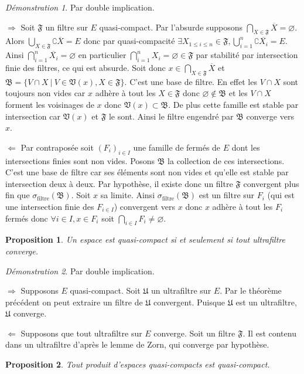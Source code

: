\documentclass[a4paper, 11pt, french]{book}
\newenvironment{itemise}{\itemize}{\enditemize}
\theoremstyle{plain} %
\newtheorem{proposition}{Proposition}
\theoremstyle{definition} %
\theoremstyle{remark} %
\newtheorem*{demonstration}{Démonstration}
\newcommand{\1}{\mathds{1}}
\newcommand\vide{\varnothing}
\renewcommand{\frak}[1]{\mathfrak{#1}}
\newcommand{\rm}[1]{\mathrm{#1}}
\newcommand\ens[2]{\{#1 \ |\ #2\}}
\newcommand\equivalence[3]{
	\begin{demonstration}
		#1
		\begin{itemise}
			\item[$\Longrightarrow$] #2
			\item[$\Longleftarrow$] #3
		\end{itemise}
	\end{demonstration}
}
\begin{document}
\equivalence{Par double implication.}{
	Soit $\frak{F}$ un filtre sur $E$ quasi-compact.
	Par l'absurde supposons $\bigcap_{X\in\frak{F}}\overline{X}=\vide$.
	Alors $\bigcup_{X\in\frak{F}}\complement\overline{X}=E$ donc par quasi-compacité $\exists X_{1\leqslant i\leqslant n}\in\frak{F}, \bigcup_{i=1}^n\complement\overline{X_i}=E$.
	Ainsi $\bigcap_{i=1}^n\overline{X_i}=\vide$ en particulier $\bigcap_{i=1}^nX_i=\vide\in\frak{F}$ par stabilité par intersection finie des filtres, ce qui est absurde.
	Soit donc $x\in\bigcap_{X\in\frak{F}}\overline{X}$ et $\frak{B}=\ens{V\cap X}{V\in\frak{V}(x), X\in\frak{F}}$.
	C'est une base de filtre.
	En effet les $V\cap X$ sont toujours non vides car $x$ adhère à tout les $X\in\frak{F}$ donc $\vide\notin\frak{B}$ et les $V\cap X$ forment les voisinages de $x$ donc $\frak{V}(x)\subset\frak{B}$.
	De plus cette famille est stable par intersection car $\frak{V}(x)$ et $\frak{F}$ le sont.
	Ainsi le filtre engendré par $\frak{B}$ converge vers $x$.
}{
	Par contraposée soit $(F_i)_{i\in I}$ une famille de fermés de $E$ dont les intersections finies sont non vides.
	Posons $\frak{B}$ la collection de ces intersections.
	C'est une base de filtre car ses éléments sont non vides et qu'elle est stable par intersection deux à deux.
	Par hypothèse, il existe donc un filtre $\frak{F}$ convergent plus fin que $\sigma_\rm{filtre}(\frak{B})$.
	Soit $x$ sa limite.
	Ainsi $\sigma_\rm{filtre}(\frak{B})$ est un filtre sur $F_i$ (qui est une intersection finie des $F_{i\in I}$) convergent vers $x$ donc $x$ adhère à tout les $F_i$ fermés donc $\forall i\in I, x\in F_i$ soit $\bigcap_{i\in I}F_i\neq\vide$.
}

\begin{proposition}
	Un espace est quasi-compact si et seulement si tout ultrafiltre converge.
\end{proposition}

\equivalence{Par double implication.}{
	Supposons $E$ quasi-compact.
	Soit $\frak{U}$ un ultrafiltre sur $E$.
	Par le théorème précédent on peut extraire un filtre de $\frak{U}$ convergent.
	Puisque $\frak{U}$ est un ultrafiltre, $\frak{U}$ converge.
}{
	Supposons que tout ultrafiltre sur $E$ converge.
	Soit un filtre $\frak{F}$.
	Il est contenu dans un ultrafiltre d'après le lemme de Zorn, qui converge par hypothèse.
}

\begin{proposition}
	Tout produit d’espaces quasi-compacts est quasi-compact.
\end{proposition}
\end{document}
